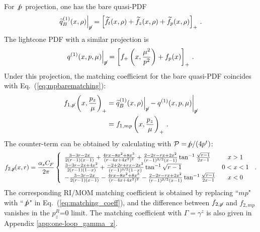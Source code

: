 For $\slashed{p}$ projection, one has the bare quasi-PDF
\begin{align}
\widetilde{q}_B^{(1)}(x,\rho)\Big|_{\slashed{p}}=\left[\widetilde{f}_t(x,\rho)+\widetilde{f}_z(x,\rho)+\widetilde{f}_p(x,\rho)\right]_+\,.
\end{align}
The  lightcone PDF with a similar projection is
\begin{align}
q^{(1)}(x,p,\mu)\Big|_{\slashed{p}}=\left[f_+\left(x,\frac{\mu^2}{p^2}\right)+f_p(x)\right]_+\,.
\end{align}
Under this projection, the matching coefficient for the bare quasi-PDF coincides with Eq.~(\ref{eq:mpbarematching}):
\begin{align}
f_{1,\slashed p}\left(x,\frac{p_z}{\mu}\right)_+&= \widetilde{q}^{(1)}_B(x,\rho)\Big|_{\slashed p}-q^{(1)}(x,p,\mu)\bigg|_{\slashed p} \nn\\
&=f_{1,mp}\left(x,\frac{p_z}{\mu}\right)_+\,.
\end{align}
The counter-term  can  be obtained by  calculating   with ${\cal P}=\slashed{p}/(4p^t)$:
\begin{align}
f_{2,\slashed{p}}(x,r)=\frac{\alpha_s C_F}{2\pi}\left\{
\begin{array}{lc}
\frac{3-3r-2x}{2(r-1)(x-1)}+\frac{4rx-8x^2+8x^3}{(r-4x+4x^2)^2}+\frac{2-2r-rx+2x^2}{(r-1)^{3/2}(x-1)}\tan^{-1}\frac{\sqrt{r-1}}{2x-1} & x>1\\
\frac{3-3r-2x+4x^2}{2(r-1)(1-x)}+\frac{-2+2r+rx-2x^2}{(r-1)^{3/2}(1-x)}\tan^{-1}\sqrt{r-1} & 0<x<1\\
-\frac{3-3r-2x}{2(r-1)(x-1)}-\frac{4rx-8x^2+8x^3}{(r-4x+4x^2)^2}-\frac{2-2r-rx+2x^2}{(r-1)^{3/2}(x-1)}\tan^{-1}\frac{\sqrt{r-1}}{2x-1} & x<0
\end{array} \right.\,.
\end{align}
The corresponding RI/MOM matching coefficient is obtained by replacing ``$mp$" with ``$\slashed p$" in Eq.~(\ref{eq:matching_coeff}),  {and the difference between $f_{2,\slashed{p}}$ and $f_{2,mp}$ vanishes in the $p_z^R$=0 limit.} The matching coefficient with $\Gamma=\gamma^z$ is also given in Appendix \ref{app:one-loop_gamma_z}.




